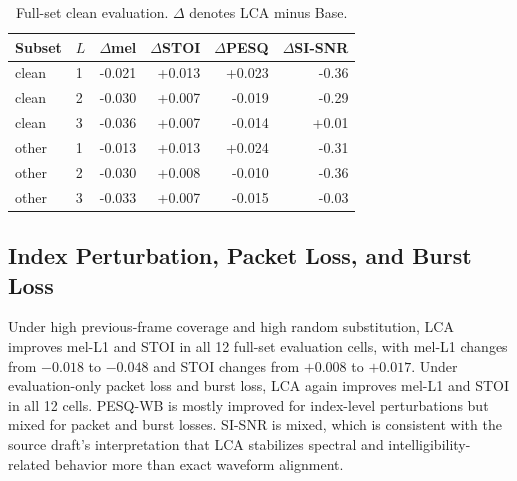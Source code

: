 ﻿\documentclass[conference]{IEEEtran}
\begin{document}
\begin{table}[t]
\centering
\caption{Full-set clean evaluation. \(\Delta\) denotes LCA minus Base.}
\label{tab:clean_full}
\small
\begin{tabular}{llrrrr}
\toprule
Subset & \(L\) & \(\Delta\)mel & \(\Delta\)STOI & \(\Delta\)PESQ & \(\Delta\)SI-SNR \\
\midrule
clean & 1 & -0.021 & +0.013 & +0.023 & -0.36 \\
clean & 2 & -0.030 & +0.007 & -0.019 & -0.29 \\
clean & 3 & -0.036 & +0.007 & -0.014 & +0.01 \\
other & 1 & -0.013 & +0.013 & +0.024 & -0.31 \\
other & 2 & -0.030 & +0.008 & -0.010 & -0.36 \\
other & 3 & -0.033 & +0.007 & -0.015 & -0.03 \\
\bottomrule
\end{tabular}
\end{table}

\subsection{Index Perturbation, Packet Loss, and Burst Loss}

Under high previous-frame coverage and high random substitution, LCA improves mel-L1 and STOI in all 12 full-set evaluation cells, with mel-L1 changes from \(-0.018\) to \(-0.048\) and STOI changes from \(+0.008\) to \(+0.017\). Under evaluation-only packet loss and burst loss, LCA again improves mel-L1 and STOI in all 12 cells. PESQ-WB is mostly improved for index-level perturbations but mixed for packet and burst losses. SI-SNR is mixed, which is consistent with the source draft's interpretation that LCA stabilizes spectral and intelligibility-related behavior more than exact waveform alignment.
\end{document}
